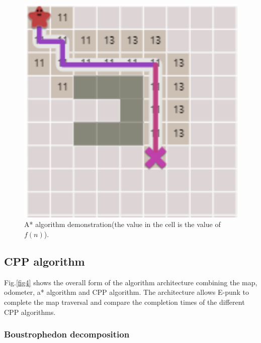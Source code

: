 \documentclass[conference]{IEEEtran}
\begin{document}
\begin{figure}[htbp]
\centerline{\includegraphics[scale=0.45]{RS_Report/astar.png}}
\caption{A* algorithm demonstration(the value in the cell is the value of $f(n)$).}
\label{fig3}
\end{figure}

\subsection{CPP algorithm}
 Fig.\ref{fig4} shows the overall form of the algorithm architecture combining the map, odometer, a* algorithm and CPP algorithm. The architecture allows E-punk to complete the map traversal and compare the completion times of the different CPP algorithms.
\subsubsection{Boustrophedon decomposition}
\end{document}

